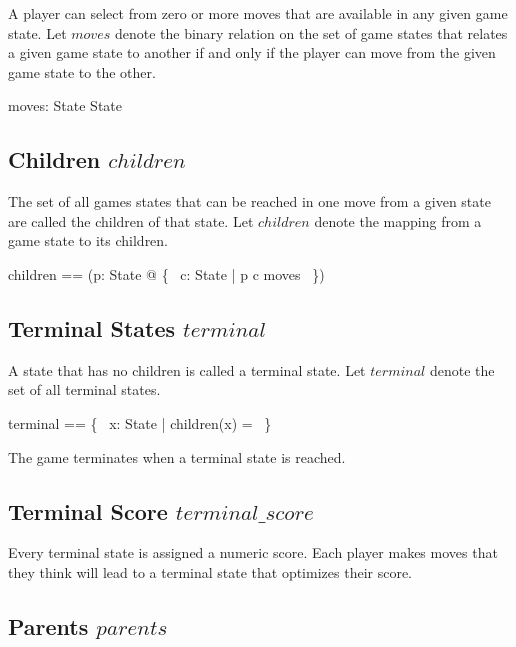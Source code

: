 \documentclass[11pt, oneside]{article}
\begin{document}
A player can select from zero or more moves that are available in any given game state.
Let $moves$ denote the binary relation on the set of game states that relates a given game state to another
if and only if the player can move from the given game state to the other.

\begin{axdef}
moves: State \rel State
\end{axdef}

\subsection{Children $children$}

The set of all games states that can be reached in one move from a given state
are called the children of that state.
Let $children$ denote the mapping from a game state to its children.

\begin{zed}
children == (\lambda p: State @ \{~ c: State | p \mapsto c \in moves ~\}) 
\end{zed}

\subsection{Terminal States $terminal$}

A state that has no children is  called a terminal state.
Let $terminal$ denote the set of all terminal states.

\begin{zed}
terminal == \{~ x: State | children(x)  = \emptyset ~\}
\end{zed}

The game terminates when a terminal state is reached.

\subsection{Terminal Score $terminal\_score$}

Every terminal state is assigned a numeric score.
Each player makes moves that they think will lead to a terminal state that optimizes their score.


\subsection{Parents $parents$}
\end{document}
